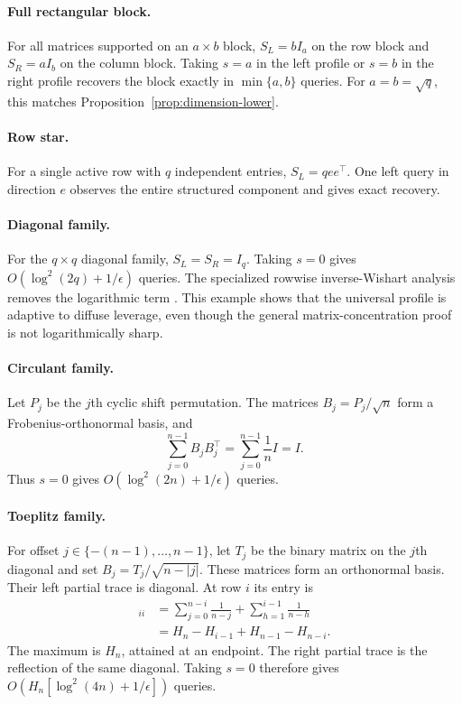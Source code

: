 \documentclass[twoside]{article}
\begin{document}
\paragraph{Full rectangular block.}
For all matrices supported on an $a\times b$ block,
$S_L=bI_a$ on the row block and $S_R=aI_b$ on the column block. Taking
$s=a$ in the left profile or $s=b$ in the right profile recovers the block
exactly in $\min\{a,b\}$ queries. For $a=b=\sqrt q$, this matches
Proposition~\ref{prop:dimension-lower}.

\paragraph{Row star.}
For a single active row with $q$ independent entries, $S_L=qee^\top$. One
left query in direction $e$ observes the entire structured component and
gives exact recovery.

\paragraph{Diagonal family.}
For the $q\times q$ diagonal family, $S_L=S_R=I_q$. Taking $s=0$ gives
$O(\log^2(2q)+1/\epsilon)$ queries. The specialized rowwise inverse-Wishart
analysis removes the logarithmic term \citep{amsel2026fixed}. This example
shows that the universal profile is adaptive to diffuse leverage, even though
the general matrix-concentration proof is not logarithmically sharp.

\paragraph{Circulant family.}
Let $P_j$ be the $j$th cyclic shift permutation. The matrices
$B_j=P_j/\sqrt n$ form a Frobenius-orthonormal basis, and
\[
 \sum_{j=0}^{n-1}B_jB_j^\top
 =\sum_{j=0}^{n-1}\frac1n I=I.
\]
Thus $s=0$ gives $O(\log^2(2n)+1/\epsilon)$ queries.

\paragraph{Toeplitz family.}
For offset $j\in\{-(n-1),\ldots,n-1\}$, let $T_j$ be the binary matrix on
the $j$th diagonal and set $B_j=T_j/\sqrt{n-|j|}$. These matrices form an
orthonormal basis. Their left partial trace is diagonal. At row $i$ its entry
is
\begin{align*}
 [S_L]_{ii}
 &=\sum_{j=0}^{n-i}\frac1{n-j}
   +\sum_{h=1}^{i-1}\frac1{n-h}\\
 &=H_n-H_{i-1}+H_{n-1}-H_{n-i}.
\end{align*}
The maximum is $H_n$, attained at an endpoint. The right partial trace is the
reflection of the same diagonal. Taking $s=0$ therefore gives
$O(H_n[\log^2(4n)+1/\epsilon])$ queries.
\end{document}
